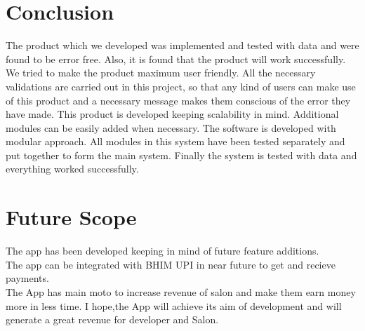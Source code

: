 \section{Conclusion}
The product which we developed was implemented and tested with data and were found to be error free. Also, it is found that the product will work successfully. We tried to make the product maximum user friendly. All the necessary validations are carried out in this project, so that any kind of users can make use of this product and a necessary message makes them conscious of the error they have made. This product is developed keeping scalability in mind. Additional modules can be easily added when necessary. The software is developed with modular approach. All modules in this system have been tested separately and put together to form the main system. Finally the system is tested with data and everything worked successfully.
\section{Future Scope}
The app has been developed keeping in mind of future feature additions.\\
The app can be integrated with BHIM UPI in near future to get and recieve payments.\\
The App has main moto to increase revenue of salon and make them earn money more in less time. I hope,the App will achieve its aim of development and will generate a great revenue for developer and Salon.
